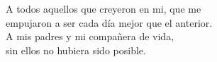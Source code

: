 \begin{dedication}

A todos aquellos que creyeron en mi, que me \\
empujaron a ser cada día mejor que el anterior. \\
A mis padres y mi compañera de vida, \\
sin ellos no hubiera sido posible.

\end{dedication}